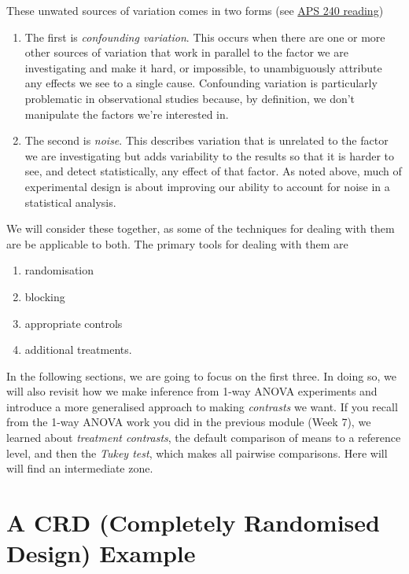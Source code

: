 \documentclass[
]{book}
\providecommand{\tightlist}{%
  \setlength{\itemsep}{0pt}\setlength{\parskip}{0pt}}
\begin{document}
These unwated sources of variation comes in two forms (see \href{https://dzchilds.github.io/stats-for-bio/principles-experimental-design.html\#confounded-and-noisy-experiments}{APS 240 reading})

\begin{enumerate}
\def\labelenumi{\arabic{enumi}.}
\item
  The first is \emph{confounding variation}. This occurs when there are one or more other sources of variation that work in parallel to the factor we are investigating and make it hard, or impossible, to unambiguously attribute any effects we see to a single cause. Confounding variation is particularly problematic in observational studies because, by definition, we don't manipulate the factors we're interested in.
\item
  The second is \emph{noise}. This describes variation that is unrelated to the factor we are investigating but adds variability to the results so that it is harder to see, and detect statistically, any effect of that factor. As noted above, much of experimental design is about improving our ability to account for noise in a statistical analysis.
\end{enumerate}

We will consider these together, as some of the techniques for dealing with them are be applicable to both. The primary tools for dealing with them are

\begin{enumerate}
\def\labelenumi{\arabic{enumi}.}
\tightlist
\item
  randomisation
\item
  blocking
\item
  appropriate controls
\item
  additional treatments.
\end{enumerate}

In the following sections, we are going to focus on the first three. In doing so, we will also revisit how we make inference from 1-way ANOVA experiments and introduce a more generalised approach to making \emph{contrasts} we want. If you recall from the 1-way ANOVA work you did in the previous module (Week 7), we learned about \emph{treatment contrasts}, the default comparison of means to a reference level, and then the \emph{Tukey test}, which makes all pairwise comparisons. Here will will find an intermediate zone.

\hypertarget{a-crd-completely-randomised-design-example}{%
\section{A CRD (Completely Randomised Design) Example}\label{a-crd-completely-randomised-design-example}}
\end{document}
